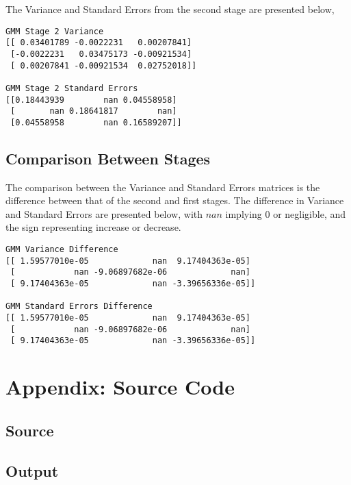 \documentclass{article}
\begin{document}
\hfill \break
The Variance and Standard Errors from the second stage are presented below,

\begin{lstlisting}
GMM Stage 2 Variance
[[ 0.03401789 -0.0022231   0.00207841]
 [-0.0022231   0.03475173 -0.00921534]
 [ 0.00207841 -0.00921534  0.02752018]]

GMM Stage 2 Standard Errors
[[0.18443939        nan 0.04558958]
 [       nan 0.18641817        nan]
 [0.04558958        nan 0.16589207]]
\end{lstlisting}

\subsection{Comparison Between Stages}
The comparison between the Variance and Standard Errors matrices is the difference between that of the second and first stages. The difference in Variance and Standard Errors are presented below, with $nan$ implying $0$ or negligible, and the sign representing increase or decrease.

\begin{lstlisting}
GMM Variance Difference
[[ 1.59577010e-05             nan  9.17404363e-05]
 [            nan -9.06897682e-06             nan]
 [ 9.17404363e-05             nan -3.39656336e-05]]

GMM Standard Errors Difference
[[ 1.59577010e-05             nan  9.17404363e-05]
 [            nan -9.06897682e-06             nan]
 [ 9.17404363e-05             nan -3.39656336e-05]]
\end{lstlisting}

\newpage
\section{Appendix: Source Code}
\subsection{Source}



\subsection{Output}
\end{document}
